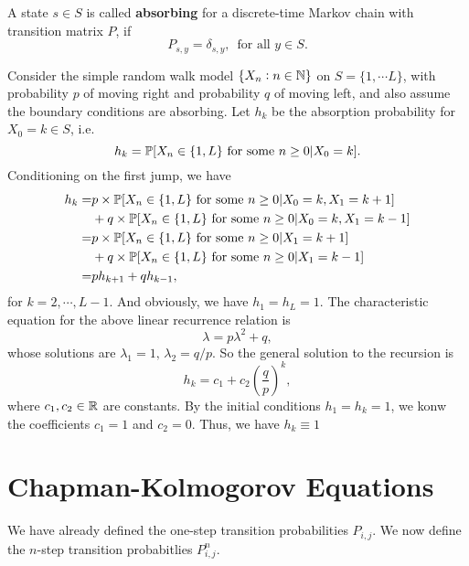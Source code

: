\begin{definition}
    A state $s \in S$ is called \textbf{absorbing} for a discrete-time Markov chain with transition matrix $P$, if 
    $$P_{s, y} = \delta_{s, y}, \, \text{ for all $y \in S$}.$$
\end{definition}

\begin{example}
    Consider the simple random walk model $\{X_n: n \in \mathbb{N}\}$ on $S = \{1, \cdots L\}$, with probability $p$ of moving right and probability $q$ of moving left, and also assume the boundary conditions are absorbing. Let $h_k$ be the absorption probability for $X_0 = k \in S$, i.e. 
    $$
    h_k = \mathbb{P} [X_n \in \{1, L\} \text{ for some } n \ge 0 | X_0 = k].
    $$
    Conditioning on the first jump, we have 
    \begin{align*}
        h_k = & p \times \mathbb{P} [X_n \in \{1, L\} \text{ for some } n \ge 0 | X_0 = k, X_1 = k+1] \\ 
        & + q  \times\mathbb{P} [X_n \in \{1, L\} \text{ for some } n \ge 0 | X_0 = k, X_1 = k-1] \\ 
        = &  p \times \mathbb{P} [X_n \in \{1, L\} \text{ for some } n \ge 0 | X_1 = k+1] \\ 
        & + q \times \mathbb{P} [X_n \in \{1, L\} \text{ for some } n \ge 0 |  X_1 = k-1] \\ 
        =  &p h_{k+1} + q h_{k-1},
    \end{align*}
    for $k = 2, \cdots, L-1$. And obviously, we have $h_1 = h_L = 1$.
    The characteristic equation for the above linear recurrence relation is 
    $$\lambda = p \lambda^2 + q,$$
    whose solutions are $\lambda_1 = 1, \, \lambda_2 = q/p$. So the general solution to the recursion is 
    $$h_k = c_1 + c_2 \left( \frac{q}{p} \right)^k,$$
    where $c_1, c_2 \in \mathbb{R}$ are constants. By the initial conditions $h_1 = h_k = 1$, we konw the coefficients $c_1 =1$ and $c_2 = 0$. Thus, we have $h_k \equiv 1$
\end{example}


\section{Chapman-Kolmogorov Equations}

We have already defined the one-step transition probabilities $P_{i,j}$. We now define the $n$-step transition probabitlies $P^n_{i, j}$.

